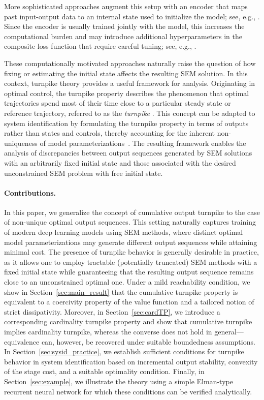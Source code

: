 \documentclass[a4paper,fleqn]{cas-dc}
\begin{document}
More sophisticated approaches augment this setup with an encoder that maps past input-output data to an internal state used to initialize the model; see, e.g., \cite{Masti2021,Beintema2023,Beintema2023a,Bemporad2025}. Since the encoder is usually trained jointly with the model, this increases the computational burden and may introduce additional hyperparameters in the composite loss function that require careful tuning; see, e.g., \cite{Masti2021,Mohajerin2019}.

These computationally motivated approaches naturally raise the question of how fixing or estimating the initial state affects the resulting SEM solution. In this context, turnpike theory provides a useful framework for analysis. Originating in optimal control, the turnpike property describes the phenomenon that optimal trajectories spend most of their time close to a particular steady state or reference trajectory, referred to as the \emph{turnpike}  \cite{Faulwasser2022,Gruene2016a,Gruene2018,Zaslavski2006,Trelat2018a}.
This concept can be adapted to system identification by formulating the turnpike property in terms of outputs rather than states and controls, thereby accounting for the inherent non-uniqueness of model parameterizations~\cite{Schiller2025b}.
The resulting framework enables the analysis of discrepancies between output sequences generated by SEM solutions with an arbitrarily fixed initial state and those associated with the desired unconstrained SEM problem with free initial state.

\paragraph{Contributions.}
In this paper, we generalize the concept of cumulative output turnpike to the case of non-unique optimal output sequences.
This setting naturally captures training of modern deep learning models using SEM methods, where distinct optimal model parameterizations may generate different output sequences while attaining minimal cost.
The presence of turnpike behavior is generally desirable in practice, as it allows one to employ tractable (potentially truncated) SEM methods with a fixed initial state while guaranteeing that the resulting output sequence remains close to an unconstrained optimal one.
Under a mild reachability condition, we show in Section~\ref{sec:main_result} that the cumulative turnpike property is equivalent to a coercivity property of the value function and a tailored notion of strict dissipativity.
Moreover, in Section~\ref{sec:cardTP}, we introduce a corresponding cardinality turnpike property and show that cumulative turnpike implies cardinality turnpike, whereas the converse does not hold in general---equivalence can, however, be recovered under suitable boundedness assumptions. In Section~\ref{sec:sysid_practice}, we establish sufficient conditions for turnpike behavior in system identification based on incremental output stability, convexity of the stage cost, and a suitable optimality condition. Finally, in Section~\ref{sec:example}, we illustrate the theory using a simple Elman-type recurrent neural network for which these conditions can be verified analytically.
\end{document}
